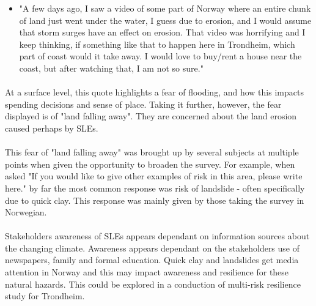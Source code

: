 \begin{itemize}
    \item "A few days ago, I saw a video of some part of Norway where an entire chunk of land just went under the water, I guess due to erosion, and I would assume that storm surges have an effect on erosion. That video was horrifying and I keep thinking, if something like that to happen here in Trondheim, which part of coast would it take away. I would love to buy/rent a house near the coast, but after watching that, I am not so sure."
\end{itemize}
\paragraph{}

At a surface level, this quote highlights a fear of flooding, and how this impacts spending decisions and sense of place. Taking it further, however, the fear displayed is of "land falling away". They are concerned about the land erosion caused perhaps by SLEs.
\paragraph{}
This fear of "land falling away" was brought up by several subjects at multiple points when given the opportunity to broaden the survey. For example, when asked "If you would like to give other examples of risk in this area, please write here." by far the most common response was risk of landslide - often specifically due to quick clay. This response was mainly given by those taking the survey in Norwegian. 
\paragraph{}
Stakeholders awareness of SLEs appears dependant on information sources about the changing climate. Awareness appears dependant on the stakeholders use of newspapers, family and formal education. Quick clay and landslides get media attention in Norway and this may impact awareness and resilience for these natural hazards. This could be explored in a conduction of multi-risk resilience study for Trondheim.  
